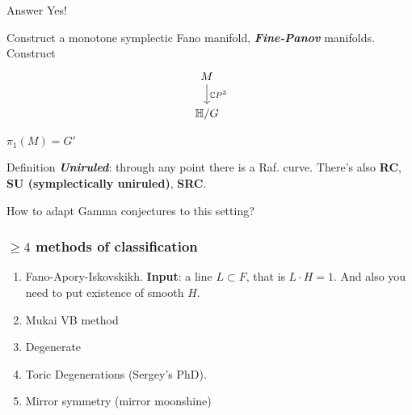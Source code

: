 \begin{thing4}{Answer}\leavevmode
	Yes!
\end{thing4}

Construct a monotone symplectic Fano manifold, \textit{\textbf{Fine-Panov}} manifolds. Construct
\[\begin{tikzcd}
M\arrow[d,"\mathbb{C}P^{3}"]\\
\mathbb{H}/G
\end{tikzcd}\]

\begin{coro}\leavevmode
	$\pi_{1}(M)=G'$
\end{coro}

\begin{thing4}{Definition}\leavevmode
\textit{\textbf{Uniruled}}: through any point there is a Raf. curve. There's also {\bfseries RC}, {\bfseries SU (symplectically uniruled)}, {\bfseries SRC}.
\end{thing4}

\begin{question}[Sergey]\leavevmode
	How to adapt Gamma conjectures to this setting?
\end{question}

\subsubsection{$\geq 4$ methods of classification}

\begin{enumerate}
\item Fano-Apory-Iskovskikh. \textbf{Input}: a line $L \subset F$, that is $L\cdot H=1$. And also you need to put existence of smooth $H$.

\item Mukai VB method
\item Degenerate
\item Toric Degenerations (Sergey's PhD).
\item Mirror symmetry (mirror moonshine)
\end{enumerate}



